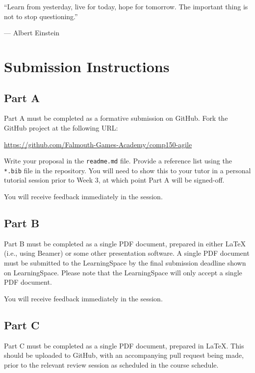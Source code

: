 \documentclass{../fal_assignment}
\begin{document}
\begin{marginquote}
    ``Learn from yesterday, live for today, hope for tomorrow. The important thing is not to stop questioning.''
    
    --- Albert Einstein
\end{marginquote}

\section*{Submission Instructions}

\subsection*{Part A}

Part A must be completed as a formative submission on GitHub. Fork the GitHub project at the following URL:

\indent \url{https://github.com/Falmouth-Games-Academy/comp150-agile}

Write your proposal in the \texttt{readme.md} file. Provide a reference list using the \texttt{*.bib} file in the repository. You will need to show this to your tutor in a personal tutorial session prior to Week 3, at which point Part A will be signed-off. 

You will receive feedback immediately in the session.

\subsection*{Part B}

Part B must be completed as a single PDF document, prepared in either LaTeX (i.e., using Beamer) or some other presentation software. A single PDF document must be submitted to the LearningSpace by the final submission deadline shown on LearningSpace. Please note that the LearningSpace will only accept a single PDF document. 

You will receive feedback immediately in the session.

\subsection*{Part C}

Part C must be completed as a single PDF document, prepared in LaTeX. This should be uploaded to GitHub, with an accompanying pull request being made, prior to the relevant review session as scheduled in the course schedule. 
\end{document}
